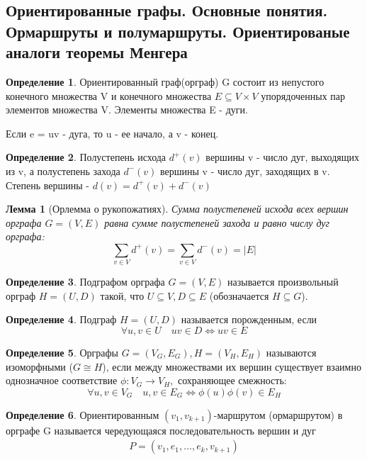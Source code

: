\documentclass[a4paper]{article}
\newtheorem{lemma}{Лемма}[section]
\theoremstyle{definition}
\newtheorem*{definition}{Определение}
\theoremstyle{remark}
\begin{document}
\begin{multicols*}{2}
    \section{Ориентированные графы. Основные понятия. Ормаршруты и полумаршруты. 
    Ориентированые аналоги теоремы Менгера}
    \begin{definition}
        Ориентированный граф(орграф) G состоит из непустого конечного множества V и конечного множества $E\subseteq V \times V$ упорядоченных пар элементов множества V. Элементы множества E - дуги.
    \end{definition}
    Если e = uv - дуга, то u - ее начало, а v - конец.
    \begin{definition}
        Полустепень исхода $d^+(v)$ вершины v - число дуг, выходящих из v, а полустепень захода $d^-(v)$ вершины v - число дуг, заходящих в v.
        Степень вершины - $d(v) = d^+(v) + d^-(v)$
    \end{definition}
    \begin{lemma}[Орлемма о рукопожатиях]
        Сумма полустепеней исхода всех вершин орграфа $G = (V, E)$ равна сумме полустепеней захода и равно числу дуг орграфа:
        $$\sum_{v\in V}d^+(v) = \sum_{v\in V}d^-(v) = |E|$$
    \end{lemma}
    \begin{definition}
        Подграфом орграфа $G = (V, E)$ называется произвольный орграф $H = (U, D)$ такой, что $U\subseteq V, D \subseteq E$ (обозначается $H\subseteq G$).
    \end{definition}
    \begin{definition}
        Подграф $H = (U, D)$ называется порожденным, если 
        $$\forall u, v\in U \quad uv\in D \Leftrightarrow uv \in E$$
    \end{definition}
    \begin{definition}
        Орграфы $G = (V_G, E_G), H = (V_H, E_H)$ называются изоморфными ($G\cong H$), если между множествами их вершин существует взаимно однозначное соответствие $\phi: V_G \to V_H,$ сохраняющее смежность:
        $$\forall u, v\in V_G\quad u, v\in E_G \Leftrightarrow \phi(u)\phi(v)\in E_H$$
    \end{definition}
    \begin{definition}
        Ориентированным $(v_1, v_{k+1})$-маршрутом (ормаршрутом) в орграфе G называется
        чередующаяся последовательность вершин и дуг
        \begin{align*}
            P = (v_1, e_1, \dots, e_k, v_{k+1})
        \end{align*}

\end{definition}
\end{multicols*}
\end{document}
